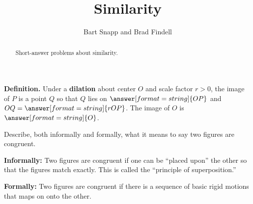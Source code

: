 \documentclass[nooutcomes]{ximera}
\title{Similarity}
\author{Bart Snapp and Brad Findell}
\begin{document}
\begin{abstract}
Short-answer problems about similarity. 
\end{abstract}
\maketitle




%
%
%
%

\begin{question}
\textbf{Definition.} Under a \textbf{dilation} about center $O$ and scale factor $r>0$, the image of $P$ is 
a point $Q$ so that $Q$ lies on  
$\answer[format=string]{OP}$ %
and $OQ=\answer[format=string]{rOP}$.  The image of $O$ is $\answer[format=string]{O}$. 
\end{question}


\begin{question}
Describe, both informally and formally, what it means to say two figures are congruent.
\begin{freeResponse}
\begin{hint}
\textbf{Informally:}  Two figures are congruent if one can be ``placed upon'' the other so that the figures match exactly.  This is called the ``principle of superposition.''  

\textbf{Formally:}  Two figures are congruent if there is a sequence of basic rigid motions that maps on onto the other.  
\end{hint}
\end{freeResponse}
\end{question}
\end{document}

